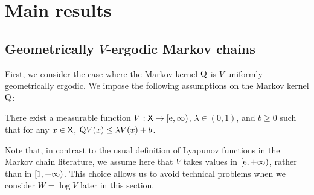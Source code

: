 \documentclass[sn-mathphys,Numbered]{sn-jnl}%
\begin{document}
\section{Main results}
\label{sec:main-results}
\subsection{Geometrically $V$-ergodic Markov chains}
\label{sec:geom-v-ergod}
First, we consider the case where the Markov kernel ${\rm Q}$ is $V$-uniformly geometrically ergodic. We impose the following assumptions on the Markov kernel ${\rm Q}$:
\begin{assumption}
\label{assG:kernelP_q}
There exist a measurable function $V: \mathsf{X} \to \left[\mathrm{e},\infty\right)$, $\lambda \in (0,1)$, and $b \geq 0$ such that for any $x \in \mathsf{X}$, ${\rm Q} V(x) \leq \lambda V(x) + b$.
\end{assumption}
Note that, in contrast to the usual definition of Lyapunov functions in the Markov chain literature, we assume here that $V$ takes values in $\left[\mathrm{e},+\infty\right)$, rather than in $\left[1,+\infty\right)$. This choice allows us to avoid technical problems when we consider $W = \log
V$ later in this section.
\end{document}
